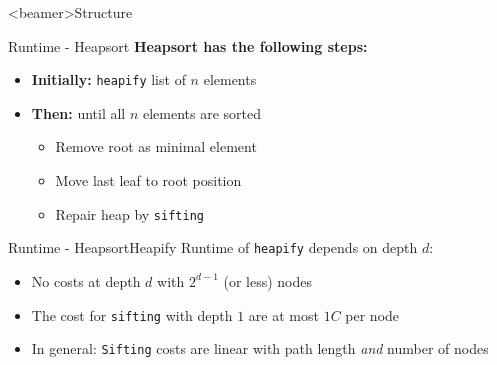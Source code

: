 \setcounter{subsubsection}{0}

\begin{frame}<beamer>{Structure}
\end{frame}


\begin{frame}{Runtime - Heapsort}
  \textbf{Heapsort has the following steps:}
  \begin{itemize}
    \item
      \textbf{Initially:} \texttt{heapify} list of $n$ elements
    \item<2- |handout:1>
    \textbf{Then:} until all $n$ elements are sorted
    \begin{itemize}
      \item<3- |handout:1>
        Remove root as minimal element
      \item<4- |handout:1>
        Move last leaf to root position
      \item<5- |handout:1>
        Repair heap by \texttt{sifting}
    \end{itemize}
  \end{itemize}
\end{frame}


\begin{frame}{Runtime - Heapsort}{Heapify}
  Runtime of \texttt{heapify} depends on depth {\color{MainA}$d$}:
  \begin{figure}[!h]
    \begin{adjustbox}{width=0.7\linewidth}
      
    \end{adjustbox}
    \vspace{-0.5em}
  \end{figure}
  \begin{itemize}
    \item<2- |handout:1>
      No costs at depth {\color{MainA}$d$} with {\color{MainA}$2^{d-1}$}
      (or less) nodes
    \item<3- |handout:1>
      The cost for \texttt{sifting} with depth {\color{MainA}$1$}
      are at most {\color{MainA}$1 C$} per node
    \item<4- |handout:1>
      In general: \texttt{Sifting} costs are linear with path length
      \textit{and} number of nodes
  \end{itemize}
\end{frame}

